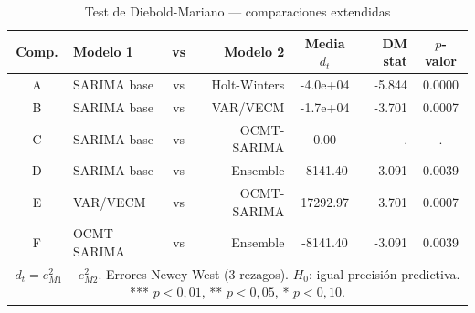 \begin{table}[htbp]
\centering
\caption{Test de Diebold-Mariano --- comparaciones extendidas}
\label{tab:dm_extendido}
\begin{tabular}{clcrcrc}
\toprule
Comp. & Modelo 1 & vs & Modelo 2 & Media $d_t$ & DM stat & $p$-valor \\
\midrule
A & SARIMA base  & vs & Holt-Winters  & -4.0e+04 & -5.844 & 0.0000 \\
B & SARIMA base  & vs & VAR/VECM      & -1.7e+04 & -3.701 & 0.0007 \\
C & SARIMA base  & vs & OCMT-SARIMA   &     0.00 &      . &      . \\
D & SARIMA base  & vs & Ensemble      & -8141.40 & -3.091 & 0.0039 \\
E & VAR/VECM     & vs & OCMT-SARIMA   & 17292.97 &  3.701 & 0.0007 \\
F & OCMT-SARIMA  & vs & Ensemble      & -8141.40 & -3.091 & 0.0039 \\
\bottomrule
\multicolumn{7}{p{0.90\textwidth}}{\footnotesize $d_t = e^2_{M1} - e^2_{M2}$. 
Errores Newey-West (3 rezagos). $H_0$: igual precisi\'{o}n predictiva. 
*** $p<0{,}01$, ** $p<0{,}05$, * $p<0{,}10$.}
\end{tabular}
\end{table}
